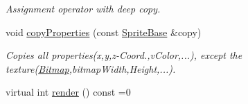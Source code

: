 \begin{DoxyCompactItemize}
\begin{DoxyCompactList}\small\item\em Assignment operator with deep copy. \item\end{DoxyCompactList}\item 
void \hyperlink{class_f2_c_1_1_sprite_base_a8f7ea8a95a07688bfb2e6268a52b9215}{copyProperties} (const \hyperlink{class_f2_c_1_1_sprite_base}{SpriteBase} \&copy)
\begin{DoxyCompactList}\small\item\em Copies all properties(x,y,z-\/Coord.,vColor,...), except the texture(\hyperlink{class_f2_c_1_1_bitmap}{Bitmap},bitmapWidth,Height,...). \item\end{DoxyCompactList}\item 
\hypertarget{class_f2_c_1_1_sprite_base_af9dfc70083ca5a774d3874b61a6f9abc}{
virtual int \hyperlink{class_f2_c_1_1_sprite_base_af9dfc70083ca5a774d3874b61a6f9abc}{render} () const =0}
\label{class_f2_c_1_1_sprite_base_af9dfc70083ca5a774d3874b61a6f9abc}


\end{DoxyCompactItemize}
